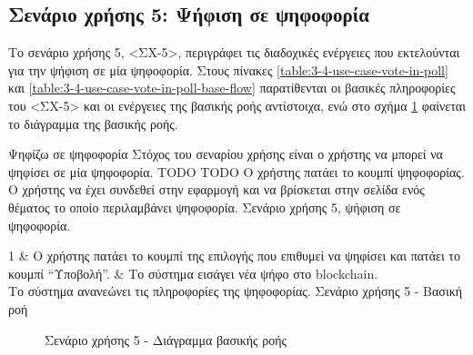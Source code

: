 \subsection{Σενάριο χρήσης 5: Ψήφιση σε ψηφοφορία} \label{subsection:3-4-use-case-vote-in-poll}

Το σενάριο χρήσης 5, <ΣΧ-5>, περιγράφει τις διαδοχικές ενέργειες που εκτελούνται για την ψήφιση σε μία ψηφοφορία. Στους πίνακες \ref{table:3-4-use-case-vote-in-poll} και \ref{table:3-4-use-case-vote-in-poll-base-flow} παρατίθενται οι βασικές πληροφορίες του <ΣΧ-5> και οι ενέργειες της βασικής ροής αντίστοιχα, ενώ στο σχήμα \ref{figure:3-4-use-case-vote-in-poll-base-flow-sequence-diagram} φαίνεται το διάγραμμα της βασικής ροής.

\useCaseTable
{Ψηφίζω σε ψηφοφορία}
{Στόχος του σεναρίου χρήσης είναι ο χρήστης να μπορεί να ψηφίσει σε μία ψηφοφορία.}
{TODO}
{TODO}
{Ο χρήστης πατάει το κουμπί ψηφοφορίας.}
{Ο χρήστης να έχει συνδεθεί στην εφαρμογή και να βρίσκεται στην σελίδα ενός θέματος το οποίο περιλαμβάνει ψηφοφορία.}
{Σενάριο χρήσης 5, ψήφιση σε ψηφοφορία.}
{\label{table:3-4-use-case-vote-in-poll}}


\useCaseBaseFlowTable
{
    1 & Ο χρήστης πατάει το κουμπί της επιλογής που επιθυμεί να ψηφίσει και πατάει το κουμπί ``Υποβολή''. & Το σύστημα εισάγει νέα ψήφο στο blockchain. \\ [0.5ex]
}
{Το σύστημα ανανεώνει τις πληροφορίες της ψηφοφορίας.}
{Σενάριο χρήσης 5 - Βασική ροή}
{\label{table:3-4-use-case-vote-in-poll-base-flow}}

\begin{figure}[H]
    \centering
    
    \caption{Σενάριο χρήσης 5 - Διάγραμμα βασικής ροής}
    \label{figure:3-4-use-case-vote-in-poll-base-flow-sequence-diagram}
\end{figure}
